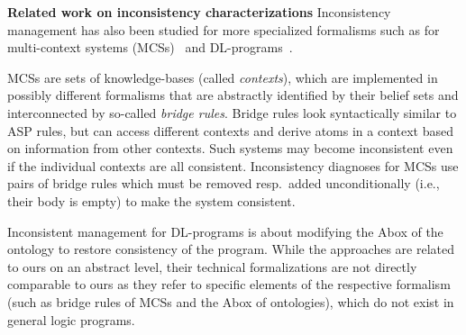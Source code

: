\documentclass[11pt,fleqn,twoside]{article}
\newcommand{\leanparagraph}[1]{\smallskip\noindent\textbf{#1}}
\begin{document}
		\leanparagraph{Related work on inconsistency characterizations}
		Inconsistency management has also been studied for more specialized formalisms
		such as for multi-context systems (MCSs)~\cite{DBLP:journals/ai/EiterFSW14} and DL-programs~\cite{Eiter2013}.
		
		MCSs are sets of knowledge-bases (called \emph{contexts}), which are implemented in possibly different formalisms that are abstractly identified by their belief sets
		and interconnected by so-called \emph{bridge rules}. Bridge rules look syntactically similar to ASP rules, but can access different contexts and derive atoms in a context based on information from other contexts.
		Such systems may become inconsistent even if the individual contexts are all consistent.
		Inconsistency diagnoses for MCSs use pairs of bridge rules which must be removed resp.~added unconditionally (i.e., their body is empty) to make the system consistent.

		Inconsistent management for DL-programs is about modifying the Abox of the ontology to restore consistency of the program.
		While the approaches are related to ours on an abstract level,
		their technical formalizations are not directly comparable to ours as they refer to specific elements of the respective formalism (such as bridge rules of MCSs and the Abox of ontologies),
		which do not exist in general logic programs.
\end{document}
